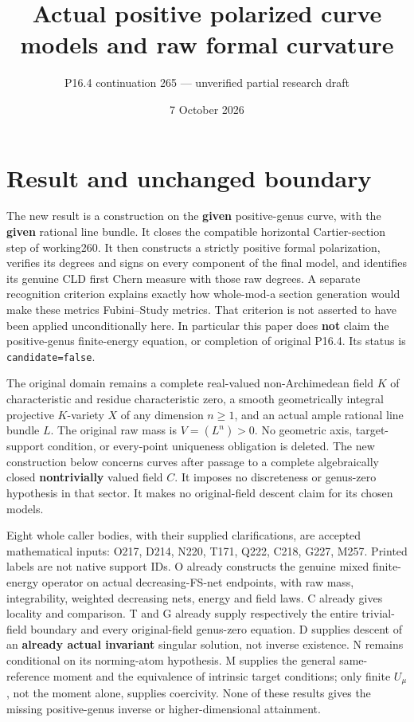 \documentclass[
  11pt,
]{article}
\title{Actual positive polarized curve models and raw formal curvature}
\author{P16.4 continuation 265 --- unverified partial research draft}
\date{7 October 2026}
\begin{document}
\maketitle

\section{Result and unchanged
boundary}\label{result-and-unchanged-boundary}

The new result is a construction on the \textbf{given} positive-genus
curve, with the \textbf{given} rational line bundle. It closes the
compatible horizontal Cartier-section step of working260. It then
constructs a strictly positive formal polarization, verifies its degrees
and signs on every component of the final model, and identifies its
genuine CLD first Chern measure with those raw degrees. A separate
recognition criterion explains exactly how whole-mod-a section
generation would make these metrics Fubini--Study metrics. That
criterion is not asserted to have been applied unconditionally here. In
particular this paper does \textbf{not} claim the positive-genus
finite-energy equation, or completion of original P16.4. Its status is
\texttt{candidate=false}.

The original domain remains a complete real-valued non-Archimedean field
\(K\) of characteristic and residue characteristic zero, a smooth
geometrically integral projective \(K\)-variety \(X\) of any dimension
\(n\geq1\), and an actual ample rational line bundle \(L\). The original
raw mass is \(V=(L^n)>0\). No geometric axis, target-support condition,
or every-point uniqueness obligation is deleted. The new construction
below concerns curves after passage to a complete algebraically closed
\textbf{nontrivially} valued field \(C\). It imposes no discreteness or
genus-zero hypothesis in that sector. It makes no original-field descent
claim for its chosen models.

Eight whole caller bodies, with their supplied clarifications, are
accepted mathematical inputs: O217, D214, N220, T171, Q222, C218, G227,
M257. Printed labels are not native support IDs. O already constructs
the genuine mixed finite-energy operator on actual decreasing-FS-net
endpoints, with raw mass, integrability, weighted decreasing nets,
energy and field laws. C already gives locality and comparison. T and G
already supply respectively the entire trivial-field boundary and every
original-field genus-zero equation. D supplies descent of an
\textbf{already actual invariant} singular solution, not inverse
existence. N remains conditional on its norming-atom hypothesis. M
supplies the general same-reference moment and the equivalence of
intrinsic target conditions; only finite \(U_\mu\), not the moment
alone, supplies coercivity. None of these results gives the missing
positive-genus inverse or higher-dimensional attainment.
\end{document}

